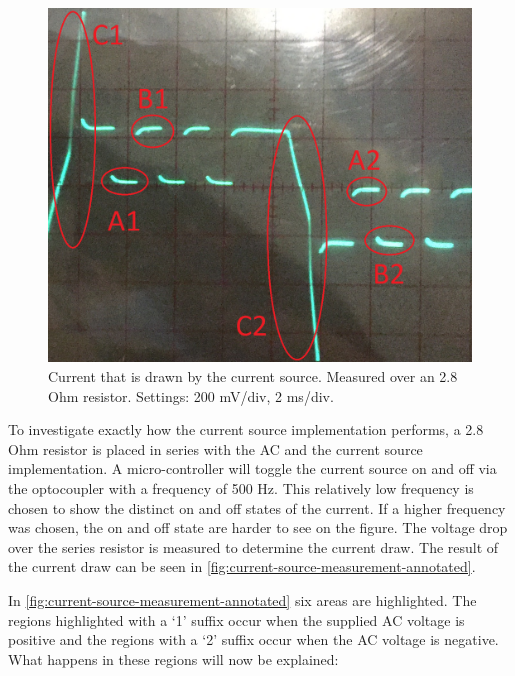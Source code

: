 \begin{figure}[ht]
\begin{minipage}[b]{0.49\textwidth}
			\includegraphics[width=\textwidth]{chapters/hardware-chapters/AC/ac-modulator/custom-hardware/ac-current-source/current-source-measurement-annotated.png}
			\caption{Current that is drawn by the current source. Measured over an 2.8 Ohm resistor. Settings: 200 mV/div, 2 ms/div.}
			\label{fig:current-source-measurement-annotated}
		\end{minipage}
	\end{figure}




	To investigate exactly how the current source implementation performs, a 2.8 Ohm resistor is placed in series with the AC and the current source implementation.
	A micro-controller will toggle the current source on and off via the optocoupler with a frequency of 500 Hz.
	This relatively low frequency is chosen to show the distinct on and off states of the current.
	If a higher frequency was chosen, the on and off state are harder to see on the figure.
	The voltage drop over the series resistor is measured to determine the current draw.
	The result of the current draw can be seen in \autoref{fig:current-source-measurement-annotated}.

	


	In \autoref{fig:current-source-measurement-annotated} six areas are highlighted.
	The regions highlighted with a `1' suffix occur when the supplied AC voltage is positive and the regions with a `2' suffix occur when the AC voltage is negative.
	What happens in these regions will now be explained:


